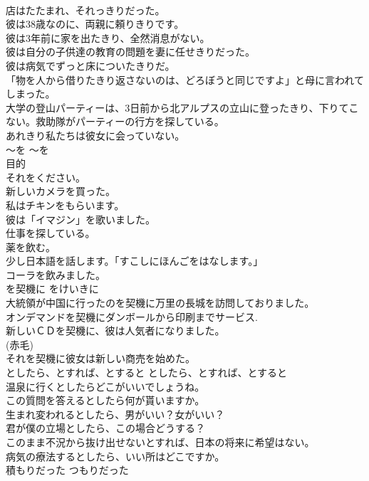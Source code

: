 \documentclass[8pt]{extreport}
\begin{document}
\begin{CJK}{UTF8}{min}
\\	店はたたまれ、それっきりだった。  
\\	彼は38歳なのに、両親に頼りきりです。  
\\	彼は3年前に家を出たきり、全然消息がない。  
\\	彼は自分の子供達の教育の問題を妻に任せきりだった。  
\\	彼は病気でずっと床についたきりだ。  
\\	「物を人から借りたきり返さないのは、どろぼうと同じですよ」と母に言われてしまった。  
\\	大学の登山パーティーは、3日前から北アルプスの立山に登ったきり、下りてこない。救助隊がパーティーの行方を探している。  
\\	あれきり私たちは彼女に会っていない。  
\\	〜を	〜を	
\\	目的	
\\	それをください。
\\	新しいカメラを買った。  
\\	私はチキンをもらいます。  
\\	彼は「イマジン」を歌いました。
\\	仕事を探している。
\\	薬を飲む。
\\	少し日本語を話します。「すこしにほんごをはなします。」  
\\	コーラを飲みました。  
\\	を契機に	をけいきに	
\\	大統領が中国に行ったのを契機に万里の長城を訪問しておりました。  
\\	オンデマンドを契機にダンボールから印刷までサービス.  
\\	新しいＣＤを契機に、彼は人気者になりました。  
\\	(赤毛)
\\	それを契機に彼女は新しい商売を始めた。   
\\	としたら、とすれば、とすると	としたら、とすれば、とすると	
\\	温泉に行くとしたらどこがいいでしょうね。  
\\	この質問を答えるとしたら何が貰いますか。  
\\	生まれ変われるとしたら、男がいい？女がいい？   
\\	君が僕の立場としたら、この場合どうする？   
\\	このまま不況から抜け出せないとすれば、日本の将来に希望はない。  
\\	病気の療法するとしたら、いい所はどこですか。  
\\	積もりだった	つもりだった	

\end{CJK}
\end{document}
